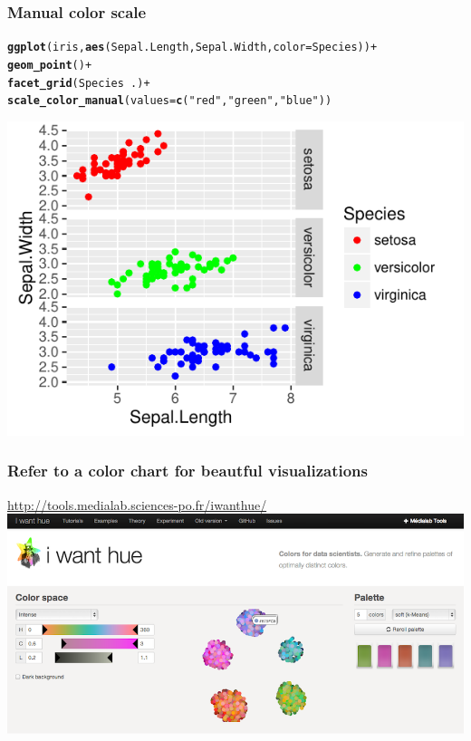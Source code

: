 \documentclass{beamer}\usepackage[]{graphicx}\usepackage[]{color}
\makeatletter
\newcommand{\hlstr}[1]{\textcolor[rgb]{0.192,0.494,0.8}{#1}}%
\newcommand{\hlopt}[1]{\textcolor[rgb]{0,0,0}{#1}}%
\newcommand{\hlstd}[1]{\textcolor[rgb]{0.345,0.345,0.345}{#1}}%
\newcommand{\hlkwc}[1]{\textcolor[rgb]{0.333,0.667,0.333}{#1}}%
\newcommand{\hlkwd}[1]{\textcolor[rgb]{0.737,0.353,0.396}{\textbf{#1}}}%
\newenvironment{kframe}{%
 \def\at@end@of@kframe{}%
 \ifinner\ifhmode%
  \def\at@end@of@kframe{\end{minipage}}%
  \begin{minipage}{\columnwidth}%
 \fi\fi%
 \def\FrameCommand##1{\hskip\@totalleftmargin \hskip-\fboxsep
 \colorbox{shadecolor}{##1}\hskip-\fboxsep
     \hskip-\linewidth \hskip-\@totalleftmargin \hskip\columnwidth}%
 \MakeFramed {\advance\hsize-\width
   \@totalleftmargin\z@ \linewidth\hsize
   \@setminipage}}%
 {\par\unskip\endMakeFramed%
 \at@end@of@kframe}
\newenvironment{knitrout}{}{} %
\makeatother
\begin{document}
\begin{frame}[fragile]
\frametitle{Manual color scale}
\begin{knitrout}\footnotesize
{}\color{fgcolor}\begin{kframe}
\begin{alltt}
\hlkwd{ggplot}\hlstd{(iris,} \hlkwd{aes}\hlstd{(Sepal.Length, Sepal.Width,} \hlkwc{color} \hlstd{= Species))} \hlopt{+}
    \hlkwd{geom_point}\hlstd{()} \hlopt{+}
    \hlkwd{facet_grid}\hlstd{(Species} \hlopt{~} \hlstd{.)} \hlopt{+}
    \hlkwd{scale_color_manual}\hlstd{(}\hlkwc{values} \hlstd{=} \hlkwd{c}\hlstd{(}\hlstr{"red"}\hlstd{,} \hlstr{"green"}\hlstd{,} \hlstr{"blue"}\hlstd{))}
\end{alltt}
\end{kframe}

{\centering \includegraphics[width=.75\linewidth]{figure/facetgridcolors-1} 

}



\end{knitrout}
\end{frame}


\begin{frame}[fragile]
\frametitle{Refer to a color chart for beautful visualizations}
\begin{center}
\url{http://tools.medialab.sciences-po.fr/iwanthue/}
\newline
\newline
\includegraphics[scale=0.25]{images/color_schemes.png}
\end{center}
\end{frame}
\end{document}
